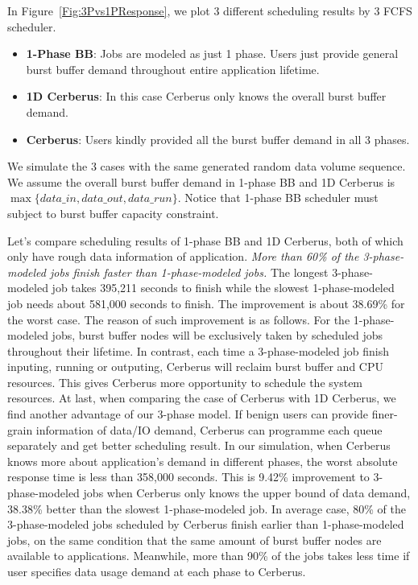 In Figure~\ref{Fig:3Pvs1PResponse}, we plot 3 different scheduling results by 3 FCFS scheduler.
\begin{itemize}
        \item \textbf{1-Phase BB}: Jobs are modeled as just 1 phase.
                Users just provide general burst buffer demand throughout
                entire application lifetime.
        \item \textbf{1D Cerberus}: In this case Cerberus only knows
                the overall burst buffer demand.
        \item \textbf{Cerberus}: Users kindly provided all the burst buffer
                demand in all 3 phases.
\end{itemize}
We simulate the 3 cases with the same generated random data volume sequence.
We assume the overall burst buffer demand in 1-phase BB and 1D Cerberus is
$\max \{data\_in, data\_out, data\_run\}$.
Notice that 1-phase BB scheduler must subject to burst buffer capacity constraint.

Let's compare scheduling results of 1-phase BB and 1D Cerberus,
both of which only have rough data information of application.
\textit{More than 60\% of the 3-phase-modeled jobs finish faster than 1-phase-modeled jobs.}
The longest 3-phase-modeled job takes 395,211 seconds to finish
while the slowest 1-phase-modeled job needs about 581,000 seconds to finish.
The improvement is about 38.69\% for the worst case.
The reason of such improvement is as follows.
For the 1-phase-modeled jobs, burst buffer nodes will be exclusively taken by scheduled jobs
throughout their lifetime.
In contrast, each time a 3-phase-modeled job finish inputing, running or outputing,
Cerberus will reclaim burst buffer and CPU resources.
This gives Cerberus more opportunity to schedule the system resources.
At last, when comparing the case of Cerberus with 1D Cerberus,
we find another advantage of our 3-phase model.
If benign users can provide finer-grain information of data/IO demand,
Cerberus can programme each queue separately and get better scheduling result.
In our simulation, when Cerberus knows more about application's demand in different phases,
the worst absolute response time is less than 358,000 seconds.
This is 9.42\% improvement to 3-phase-modeled jobs
when Cerberus only knows the upper bound of data demand,
38.38\% better than the slowest 1-phase-modeled job.
In average case, 80\% of the 3-phase-modeled jobs scheduled by Cerberus
finish earlier than 1-phase-modeled jobs,
on the same condition that the same amount of burst buffer nodes are available to applications.
Meanwhile, more than 90\% of the jobs takes less time if user specifies data usage demand
at each phase to Cerberus.

